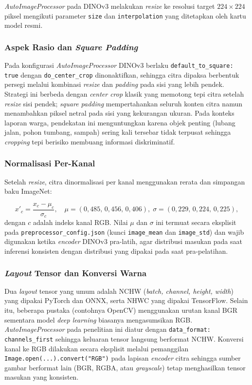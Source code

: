\textit{AutoImageProcessor} pada DINOv3 melakukan \textit{resize} ke resolusi target $224 \times 224$ piksel mengikuti parameter \texttt{size} dan \texttt{interpolation} yang ditetapkan oleh kartu model resmi.

\subsubsection{Aspek Rasio dan \textit{Square Padding}}

Pada konfigurasi \textit{AutoImageProcessor} DINOv3 berlaku \texttt{default\_to\_square: true} dengan \texttt{do\_center\_crop} dinonaktifkan, sehingga citra dipaksa berbentuk persegi melalui kombinasi \textit{resize} dan \textit{padding} pada sisi yang lebih pendek. Strategi ini berbeda dengan \textit{center crop} klasik yang memotong tepi citra setelah \textit{resize} sisi pendek; \textit{square padding} mempertahankan seluruh konten citra namun menambahkan piksel netral pada sisi yang kekurangan ukuran. Pada konteks laporan warga, pendekatan ini menguntungkan karena objek penting (lubang jalan, pohon tumbang, sampah) sering kali tersebar tidak terpusat sehingga \textit{cropping} tepi berisiko membuang informasi diskriminatif.

\subsubsection{Normalisasi Per-Kanal}

Setelah \textit{resize}, citra dinormalisasi per kanal menggunakan rerata dan simpangan baku ImageNet:

\begin{equation}
    x'_c = \frac{x_c - \mu_c}{\sigma_c}, \quad
    \mu = (0{,}485,\, 0{,}456,\, 0{,}406), \;
    \sigma = (0{,}229,\, 0{,}224,\, 0{,}225),
    \label{eq:norm}
\end{equation}
dengan $c$ adalah indeks kanal RGB. Nilai $\mu$ dan $\sigma$ ini termuat secara eksplisit pada \texttt{preprocessor\_config.json} (kunci \texttt{image\_mean} dan \texttt{image\_std}) dan wajib digunakan ketika \textit{encoder} DINOv3 pra-latih, agar distribusi masukan pada saat inferensi konsisten dengan distribusi yang dipakai pada saat pra-pelatihan.

\subsubsection{\textit{Layout} Tensor dan Konversi Warna}

Dua \textit{layout} tensor yang umum adalah NCHW (\textit{batch, channel, height, width}) yang dipakai PyTorch dan ONNX, serta NHWC yang dipakai TensorFlow. Selain itu, beberapa pustaka (contohnya OpenCV) menggunakan urutan kanal BGR sementara model \textit{deep learning} biasanya mengasumsikan RGB. \textit{AutoImageProcessor} pada penelitian ini diatur dengan \texttt{data\_format: channels\_first} sehingga keluaran tensor langsung berformat NCHW. Konversi kanal ke RGB dilakukan secara eksplisit melalui pemanggilan \texttt{Image.open(...).convert("RGB")} pada lapisan \textit{encoder} citra sehingga sumber gambar berformat lain (BGR, RGBA, atau \textit{grayscale}) tetap menghasilkan tensor masukan yang konsisten.

